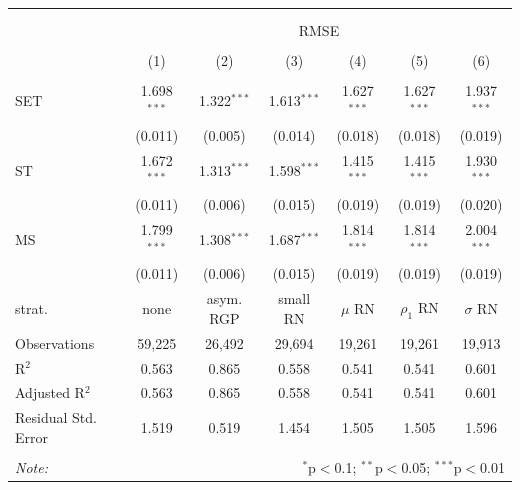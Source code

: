 \begin{tabular}{@{\extracolsep{5pt}}lcccccc} 
\\[-1.8ex]\hline 
\hline \\[-1.8ex] 
\\[-1.8ex] & \multicolumn{6}{c}{RMSE} \\ 
\\[-1.8ex] & (1) & (2) & (3) & (4) & (5) & (6)\\ 
\hline \\[-1.8ex] 
 SET & 1.698$^{***}$ & 1.322$^{***}$ & 1.613$^{***}$ & 1.627$^{***}$ & 1.627$^{***}$ & 1.937$^{***}$ \\ 
  & (0.011) & (0.005) & (0.014) & (0.018) & (0.018) & (0.019) \\ 
  ST & 1.672$^{***}$ & 1.313$^{***}$ & 1.598$^{***}$ & 1.415$^{***}$ & 1.415$^{***}$ & 1.930$^{***}$ \\ 
  & (0.011) & (0.006) & (0.015) & (0.019) & (0.019) & (0.020) \\ 
  MS & 1.799$^{***}$ & 1.308$^{***}$ & 1.687$^{***}$ & 1.814$^{***}$ & 1.814$^{***}$ & 2.004$^{***}$ \\ 
  & (0.011) & (0.006) & (0.015) & (0.019) & (0.019) & (0.019) \\ 
  strat. & none & asym. RGP & small RN & $\mu$ RN & $\rho_1$ RN & $\sigma$ RN
 \hline \\[-1.8ex] 
Observations & 59,225 & 26,492 & 29,694 & 19,261 & 19,261 & 19,913 \\ 
R$^{2}$ & 0.563 & 0.865 & 0.558 & 0.541 & 0.541 & 0.601 \\ 
Adjusted R$^{2}$ & 0.563 & 0.865 & 0.558 & 0.541 & 0.541 & 0.601 \\ 
Residual Std. Error & 1.519 & 0.519 & 1.454 & 1.505 & 1.505 & 1.596 \\ 
\hline 
\hline \\[-1.8ex] 
\textit{Note:}  & \multicolumn{6}{r}{$^{*}$p$<$0.1; $^{**}$p$<$0.05; $^{***}$p$<$0.01} \\ 
\end{tabular} 
